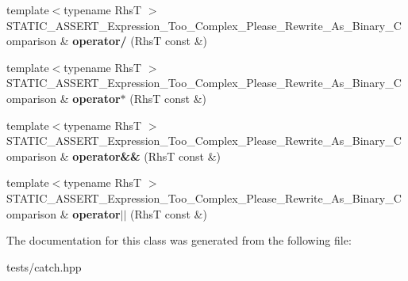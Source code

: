\begin{DoxyCompactItemize}
\mbox{\label{class_catch_1_1_expression_lhs_a37d50565046ac9b1c9159a7c0cf88a1e}} 
{\footnotesize template$<$typename RhsT $>$ }\\S\+T\+A\+T\+I\+C\+\_\+\+A\+S\+S\+E\+R\+T\+\_\+\+Expression\+\_\+\+Too\+\_\+\+Complex\+\_\+\+Please\+\_\+\+Rewrite\+\_\+\+As\+\_\+\+Binary\+\_\+\+Comparison \& {\bfseries operator/} (RhsT const \&)
\item 
\mbox{\label{class_catch_1_1_expression_lhs_a9a94294c22449f62087862ef911e6291}} 
{\footnotesize template$<$typename RhsT $>$ }\\S\+T\+A\+T\+I\+C\+\_\+\+A\+S\+S\+E\+R\+T\+\_\+\+Expression\+\_\+\+Too\+\_\+\+Complex\+\_\+\+Please\+\_\+\+Rewrite\+\_\+\+As\+\_\+\+Binary\+\_\+\+Comparison \& {\bfseries operator$\ast$} (RhsT const \&)
\item 
\mbox{\label{class_catch_1_1_expression_lhs_acbda1f937f8bd5b9da649626cc0b0f54}} 
{\footnotesize template$<$typename RhsT $>$ }\\S\+T\+A\+T\+I\+C\+\_\+\+A\+S\+S\+E\+R\+T\+\_\+\+Expression\+\_\+\+Too\+\_\+\+Complex\+\_\+\+Please\+\_\+\+Rewrite\+\_\+\+As\+\_\+\+Binary\+\_\+\+Comparison \& {\bfseries operator\&\&} (RhsT const \&)
\item 
\mbox{\label{class_catch_1_1_expression_lhs_a6932b72da79d6c6b03d867772ceac61b}} 
{\footnotesize template$<$typename RhsT $>$ }\\S\+T\+A\+T\+I\+C\+\_\+\+A\+S\+S\+E\+R\+T\+\_\+\+Expression\+\_\+\+Too\+\_\+\+Complex\+\_\+\+Please\+\_\+\+Rewrite\+\_\+\+As\+\_\+\+Binary\+\_\+\+Comparison \& {\bfseries operator$\vert$$\vert$} (RhsT const \&)
\end{DoxyCompactItemize}


The documentation for this class was generated from the following file\+:\begin{DoxyCompactItemize}
\item 
tests/catch.\+hpp\end{DoxyCompactItemize}
